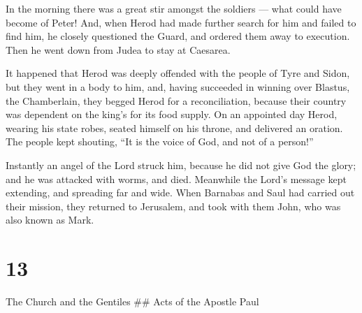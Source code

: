  In the morning there was a great stir amongst the soldiers
--- what could have become of Peter!  And, when Herod had
made further search for him and failed to find him, he closely
questioned the Guard, and ordered them away to execution. Then he went
down from Judea to stay at Caesarea.

 It happened that Herod was deeply offended with the people
of Tyre and Sidon, but they went in a body to him, and, having succeeded
in winning over Blastus, the Chamberlain, they begged Herod for a
reconciliation, because their country was dependent on the king's for
its food supply.  On an appointed day Herod, wearing his
state robes, seated himself on his throne, and delivered an oration.
 The people kept shouting, ``It is the voice of God, and
not of a person!''

 Instantly an angel of the Lord struck him, because he did
not give God the glory; and he was attacked with worms, and died.
 Meanwhile the Lord's message kept extending, and spreading
far and wide.  When Barnabas and Saul had carried out their
mission, they returned to Jerusalem, and took with them John, who was
also known as Mark.

\hypertarget{section-12}{%
\section{13}\label{section-12}}

The Church and the Gentiles \#\# Acts of the Apostle Paul


